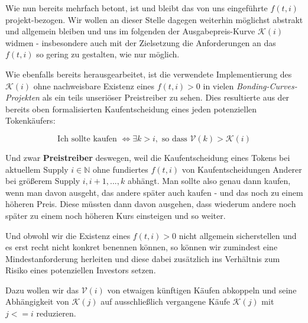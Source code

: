 \vspace{0.3cm}

Wie nun bereits mehrfach betont, ist und bleibt das von uns eingeführte $f(t, i)$ projekt-bezogen. Wir wollen an dieser Stelle dagegen weiterhin möglichst abstrakt und allgemein bleiben und uns im folgenden der Ausgabepreis-Kurve $\mathcal{K} \left( i \right)$ widmen - insbesondere auch mit der Zielsetzung die Anforderungen an das $f(t, i)$ so gering zu gestalten, wie nur möglich.

Wie ebenfalls bereits herausgearbeitet, ist die verwendete Implementierung des $\mathcal{K} \left( i \right)$ ohne nachweisbare Existenz eines $f(t, i) > 0$ in vielen \textit{Bonding-Curves-Projekten} als ein teils unseriöser Preistreiber zu sehen. Dies resultierte aus der bereits oben formalisierten Kaufentscheidung eines jeden potenziellen Tokenkäufers:

\begin{equation*}
\textrm{Ich sollte kaufen   } \Leftrightarrow \exists k > i, \textrm{  so dass } \mathcal{V} \left( k \right) > \mathcal{K} \left( i \right)
\end{equation*} 

Und zwar \textbf{Preistreiber} deswegen, weil die Kaufentscheidung eines Tokens bei aktuellem Supply $i \in \mathbb{N}$ ohne fundiertes $f(t, i)$ von Kaufentscheidungen Anderer bei größerem Supply $i, i+1,...,k$ abhängt. Man sollte also genau dann kaufen, wenn man davon ausgeht, das andere später auch kaufen - und das noch zu einem höheren Preis. Diese müssten dann davon ausgehen, dass wiederum andere noch später zu einem noch höheren Kurs einsteigen und so weiter.

\vspace{0.2cm}

Und obwohl wir die Existenz eines $f(t, i) > 0$ nicht allgemein sicherstellen und es erst recht nicht konkret benennen können, so können wir zumindest eine Mindestanforderung herleiten und diese dabei zusätzlich ins Verhältnis zum Risiko eines potenziellen Investors setzen.

Dazu wollen wir das $\mathcal{V} \left( i \right)$ von etwaigen künftigen Käufen abkoppeln und seine Abhängigkeit von $\mathcal{K} \left( j \right)$ auf ausschließlich vergangene Käufe $\mathcal{K} \left( j \right)$ mit $j <= i$ reduzieren.

\vspace{0.3cm}

